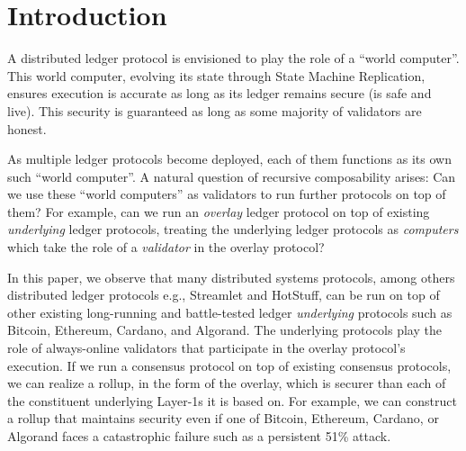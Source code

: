 
\section{Introduction}

A distributed ledger protocol is envisioned to play the role of a ``world computer''.
This world computer, evolving its state through State Machine Replication, ensures
execution is accurate as long as its ledger remains secure (is safe and live).
This security is guaranteed as long as some majority of validators are honest.

As multiple ledger protocols become deployed, each of them functions as its own
such ``world computer''. A natural question of recursive composability arises:
Can we use these ``world computers'' as validators to run further protocols on
top of them? For example, can we run an \emph{overlay} ledger protocol on top
of existing \emph{underlying} ledger protocols, treating the underlying ledger
protocols as \emph{computers} which take the role of a \emph{validator} in the
overlay protocol?

In this paper, we observe that many distributed systems protocols, among others
distributed ledger protocols e.g., Streamlet and HotStuff, can be run
on top of other existing long-running and battle-tested ledger \emph{underlying}
protocols such as Bitcoin, Ethereum, Cardano, and Algorand. The underlying protocols
play the role of always-online validators that participate in the overlay protocol's
execution. If we run a consensus protocol on top of existing consensus protocols,
we can realize a rollup, in the form of the overlay, which is securer than each
of the constituent underlying Layer-1s it is based on. For example, we can construct
a rollup that maintains security even if one of Bitcoin, Ethereum, Cardano, or Algorand
faces a catastrophic failure such as a persistent 51\% attack.

